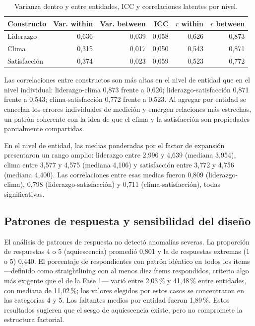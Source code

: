 \documentclass[11pt,a4paper]{article}
\begin{document}
\begin{table}[htbp]
\centering
\caption{Varianza dentro y entre entidades, ICC y correlaciones latentes por nivel.}
\label{tab:multinivel}
\small
\begin{tabular}{@{}lrrrrr@{}}
\toprule
Constructo & Var. within & Var. between & ICC & $r$ within & $r$ between \\
\midrule
Liderazgo & 0,636 & 0,039 & 0,058 & 0,626 & 0,873 \\
Clima & 0,315 & 0,017 & 0,050 & 0,543 & 0,871 \\
Satisfacción & 0,374 & 0,023 & 0,059 & 0,523 & 0,772 \\
\bottomrule
\end{tabular}
\end{table}

Las correlaciones entre constructos son más altas en el nivel de entidad que en el nivel
individual: liderazgo-clima 0,873 frente a 0,626; liderazgo-satisfacción 0,871 frente a
0,543; clima-satisfacción 0,772 frente a 0,523. Al agregar por entidad se cancelan los
errores individuales de medición y emergen relaciones más estrechas, un patrón coherente con
la idea de que el clima y la satisfacción son propiedades parcialmente compartidas.

En el nivel de entidad, las medias ponderadas por el factor de expansión presentaron un
rango amplio: liderazgo entre 2,996 y 4,639 (mediana 3,954), clima entre 3,577 y 4,575
(mediana 4,106) y satisfacción entre 3,772 y 4,756 (mediana 4,400). Las correlaciones entre
esas medias fueron 0,809 (liderazgo-clima), 0,798 (liderazgo-satisfacción) y 0,711
(clima-satisfacción), todas significativas.

\subsection{Patrones de respuesta y sensibilidad del diseño}\label{sec:sens}

El análisis de patrones de respuesta no detectó anomalías severas. La proporción de
respuestas 4 o 5 (aquiescencia) promedió 0,801 y la de respuestas extremas (1 o 5) 0,440.
El porcentaje de respondientes con patrón idéntico en todos los ítems —definido como
straightlining con al menos diez ítems respondidos, criterio algo más exigente que el de la
Fase 1— varió entre 2,03\,\% y 41,48\,\% entre
entidades, con mediana de 11,02\,\%; los valores elegidos por estos casos se concentraron en
las categorías 4 y 5. Los faltantes medios por entidad fueron 1,89\,\%. Estos resultados
sugieren que el sesgo de aquiescencia existe, pero no compromete la estructura factorial.
\end{document}

